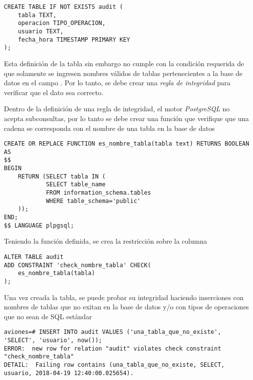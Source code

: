 \vspace*{5mm}
\lstset{style=sql}
\begin{lstlisting}
CREATE TABLE IF NOT EXISTS audit (
    tabla TEXT,
    operacion TIPO_OPERACION,
    usuario TEXT,
    fecha_hora TIMESTAMP PRIMARY KEY
);
\end{lstlisting}

Esta definición de la tabla sin embargo no cumple con la condición requerida de que solamente se ingresen nombres válidos de tablas pertenecientes a la base de datos en el campo . Por lo tanto, se debe crear una \emph{regla de integridad} para verificar que el dato sea correcto.

Dentro de la definición de una regla de integridad, el motor \emph{PostgreSQL} no acepta subconsultas, por lo tanto se debe crear una función que verifique que una cadena se corresponda con el nombre de una tabla en la base de datos 

\vspace*{5mm}
\lstset{style=sql}
\begin{lstlisting}
CREATE OR REPLACE FUNCTION es_nombre_tabla(tabla text) RETURNS BOOLEAN AS 
$$
BEGIN
    RETURN (SELECT tabla IN (
            SELECT table_name 
            FROM information_schema.tables 
            WHERE table_schema='public'
    ));
END;
$$ LANGUAGE plpgsql;
\end{lstlisting}

Teniendo la función definida, se crea la restricción sobre la columna  

\vspace*{5mm}
\lstset{style=sql}
\begin{lstlisting}
ALTER TABLE audit
ADD CONSTRAINT 'check_nombre_tabla' CHECK(
    es_nombre_tabla(tabla)
);
\end{lstlisting}

Una vez creada la tabla, se puede probar su integridad haciendo inserciones con nombres de tablas que no exitan en la base de datos y/o con tipos de operaciones que no sean de SQL estándar

\clearpage
\vspace*{5mm}
\lstset{style=sql}
\begin{lstlisting}
aviones=# INSERT INTO audit VALUES ('una_tabla_que_no_existe', 'SELECT', 'usuario', now()); 
ERROR:  new row for relation "audit" violates check constraint "check_nombre_tabla"
DETAIL:  Failing row contains (una_tabla_que_no_existe, SELECT, usuario, 2018-04-19 12:40:00.025654).
\end{lstlisting}

